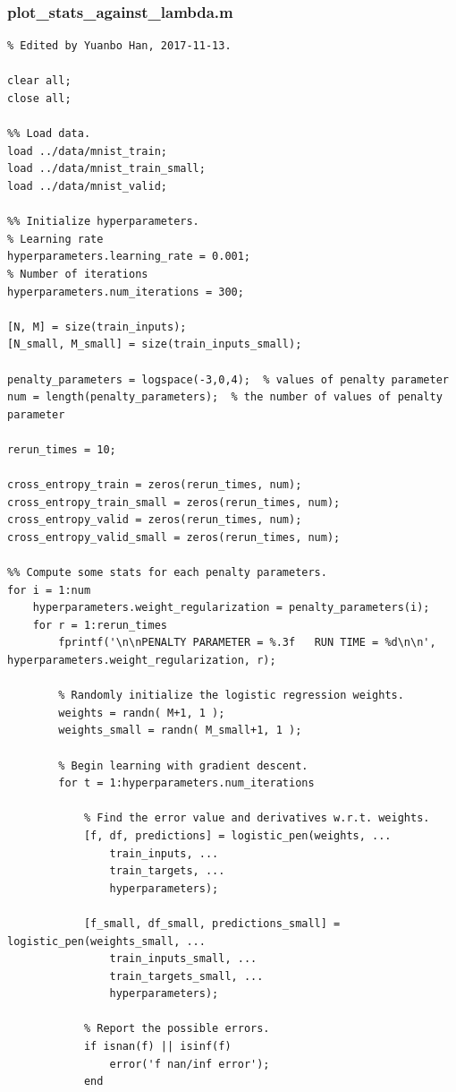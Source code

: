 \documentclass{article}
\begin{document}
\subsubsection{plot\_stats\_against\_lambda.m}
\begin{lstlisting}
% Edited by Yuanbo Han, 2017-11-13.

clear all;
close all;

%% Load data.
load ../data/mnist_train;
load ../data/mnist_train_small;
load ../data/mnist_valid;

%% Initialize hyperparameters.
% Learning rate
hyperparameters.learning_rate = 0.001;
% Number of iterations
hyperparameters.num_iterations = 300;

[N, M] = size(train_inputs);
[N_small, M_small] = size(train_inputs_small);

penalty_parameters = logspace(-3,0,4);  % values of penalty parameter
num = length(penalty_parameters);  % the number of values of penalty parameter

rerun_times = 10;

cross_entropy_train = zeros(rerun_times, num);
cross_entropy_train_small = zeros(rerun_times, num);
cross_entropy_valid = zeros(rerun_times, num);
cross_entropy_valid_small = zeros(rerun_times, num);

%% Compute some stats for each penalty parameters.
for i = 1:num
    hyperparameters.weight_regularization = penalty_parameters(i);
    for r = 1:rerun_times
        fprintf('\n\nPENALTY PARAMETER = %.3f   RUN TIME = %d\n\n', hyperparameters.weight_regularization, r);
        
        % Randomly initialize the logistic regression weights.
        weights = randn( M+1, 1 );
        weights_small = randn( M_small+1, 1 );
        
        % Begin learning with gradient descent.
        for t = 1:hyperparameters.num_iterations
            
            % Find the error value and derivatives w.r.t. weights.
            [f, df, predictions] = logistic_pen(weights, ...
                train_inputs, ...
                train_targets, ...
                hyperparameters);
            
            [f_small, df_small, predictions_small] = logistic_pen(weights_small, ...
                train_inputs_small, ...
                train_targets_small, ...
                hyperparameters);
            
            % Report the possible errors.
            if isnan(f) || isinf(f)
                error('f nan/inf error');
            end
            

\end{lstlisting}
\end{document}

